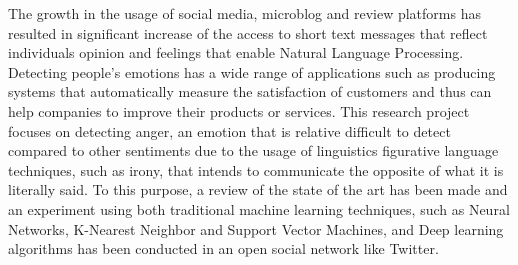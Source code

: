 The growth in the usage of social media, microblog and review platforms has resulted in significant increase of the access to short text messages that reflect individuals opinion and feelings that enable Natural Language Processing. Detecting people's emotions has a wide range of applications such as producing systems that automatically measure the satisfaction of customers and thus can help companies to improve their products or services. This research project focuses on detecting anger, an emotion that is relative difficult to detect compared to other sentiments due to the usage of linguistics figurative language techniques, such as irony, that intends to communicate the opposite of what it is literally said.
To this purpose, a review of the state of the art has been made and an experiment using both traditional machine learning techniques, such as Neural Networks, K-Nearest Neighbor and Support Vector Machines, and Deep learning algorithms has been conducted in an open social network like Twitter.